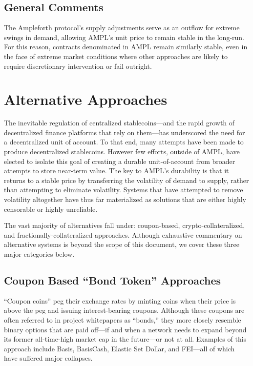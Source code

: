 \documentclass[11pt]{article}
\begin{document}
\subsection{General Comments}

The Ampleforth protocol's supply adjustments serve as an outflow for extreme swings in demand,
allowing AMPL's unit price to remain stable in the long-run. For this reason, contracts
denominated in AMPL remain similarly stable, even in the face of extreme market conditions
where other approaches are likely to require discretionary intervention or fail outright.

\section{Alternative Approaches}

The inevitable regulation of centralized stablecoins---and the rapid growth of decentralized
finance platforms that rely on them---has underscored the need for a decentralized unit of
account. To that end, many attempts have been made to produce decentralized stablecoins.
However few efforts, outside of AMPL, have elected to isolate this goal of creating a durable
unit-of-account from broader attempts to store near-term value. The key to AMPL's durability
is that it returns to a stable price by transferring the volatility of demand to supply,
rather than attempting to eliminate volatility. Systems that have attempted to remove
volatility altogether have thus far materialized as solutions that are either highly censorable
or highly unreliable.

The vast majority of alternatives fall under: coupon-based, crypto-collateralized, and
fractionally-collateralized approaches. Although exhaustive commentary on alternative systems
is beyond the scope of this document, we cover these three major categories below.

\subsection{Coupon Based ``Bond Token'' Approaches}

``Coupon coins'' peg their exchange rates by minting coins when their price is above the peg
and issuing interest-bearing coupons. Although these coupons are often referred to in project
whitepapers as ``bonds,'' they more closely resemble binary options that are paid off---if and
when a network needs to expand beyond its former all-time-high market cap in the future---or
not at all. Examples of this approach include Basis, BasisCash, Elastic Set Dollar, and
FEI---all of which have suffered major collapses.
\end{document}
